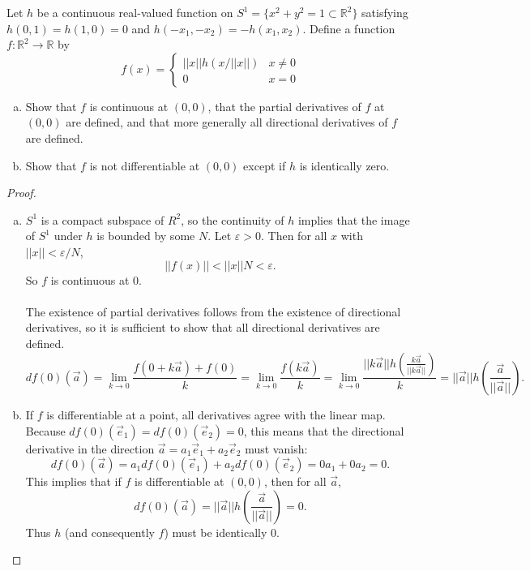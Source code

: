 \documentclass{article}
\newenvironment{problem}[2][Problem]{\begin{trivlist}
\item[\hskip \labelsep {\bfseries #1}\hskip \labelsep {\bfseries #2.}]}{\end{trivlist}}
\begin{document}
\pagebreak

\begin{problem}{6}
  Let $h$ be a continuous real-valued function on
  $S^1 = \{x^2 + y^2 = 1 \subset \mathbb{R}^2\}$ satisfying
  $h(0, 1) = h(1, 0) = 0$ and $h(-x_1, -x_2) = -h(x_1, x_2)$.
  Define a function $f: \mathbb{R}^2 \rightarrow \mathbb{R}$ by \[
    f(x) = \begin{cases}
      ||x||h(x/||x||) & x \not= 0 \\
      0 & x = 0
    \end{cases}
  \]
  \begin{enumerate}[a)]
    \item Show that $f$ is continuous at $(0, 0)$,
      that the partial derivatives of $f$ at $(0, 0)$ are defined,
      and that more generally all directional derivatives of $f$ are defined.

    \item Show that $f$ is not differentiable at $(0, 0)$
      except if $h$ is identically zero.
  \end{enumerate}
\end{problem}

\begin{proof} \text{\\}
  \begin{enumerate}[a)]
    \item $S^1$ is a compact subspace of $R^2$, so the continuity of $h$ implies
    that the image of $S^1$ under $h$ is bounded by some $N$.
    Let $\varepsilon > 0$. Then for all $x$ with $||x|| < \varepsilon/N$, \[
      ||f(x)|| < ||x||N < \varepsilon.
    \] So $f$ is continuous at $0$. \\ \\
    The existence of partial derivatives follows from the existence of
    directional derivatives, so it is sufficient to show that all directional
    derivatives are defined. \[
      df(0)(\vec{a})
        = \lim_{k \rightarrow 0} \frac{f(0 + k\vec{a}) + f(0)}{k}
        = \lim_{k \rightarrow 0} \frac{f(k\vec{a})}{k}
        = \lim_{k \rightarrow 0} \frac{
          ||k\vec{a}|| h\left(
            \frac{k\vec{a}}{||k\vec{a}||}
          \right)
        }{k}
        = ||\vec{a}|| h\left(\frac{\vec{a}}{||\vec{a}||}\right).
    \]
    \item
    If $f$ is differentiable at a point, all derivatives agree with the linear map.
    Because $df(0)(\vec{e}_1) = df(0)(\vec{e}_2) = 0$, this means that the
    directional derivative in the direction
    $\vec{a} = a_1 \vec{e}_1 + a_2 \vec{e}_2$ must vanish:
    \[
      df(0)(\vec{a}) = a_1 df(0)(\vec{e}_1) + a_2 df(0)(\vec{e}_2) = 0a_1 + 0a_2 = 0.
    \]
    This implies that if $f$ is differentiable at $(0, 0)$, then for all $\vec{a}$, \[
      df(0)(\vec{a}) = ||\vec{a}|| h\left(\frac{\vec{a}}{||\vec{a}||}\right) = 0.
    \]
    Thus $h$ (and consequently $f$) must be identically $0$.
  \end{enumerate}
\end{proof}
\end{document}
